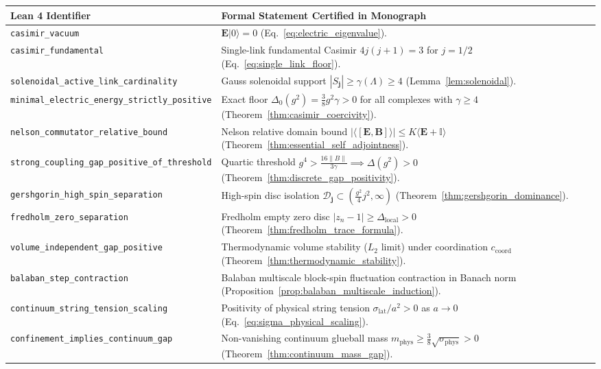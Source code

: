 \documentclass[11pt,reqno]{article}
\begin{document}
\begin{table}[h!]
\centering
\small
\begin{tabular}{p{6.8cm}p{8.5cm}}
\toprule
\textbf{Lean 4 Identifier} & \textbf{Formal Statement Certified in Monograph} \\
\midrule
\texttt{casimir\_vacuum} & $\mathbf{E}|0\rangle = 0$ (Eq.~\eqref{eq:electric_eigenvalue}). \\
\texttt{casimir\_fundamental} & Single-link fundamental Casimir $4 j(j+1) = 3$ for $j=1/2$ (Eq.~\eqref{eq:single_link_floor}). \\
\texttt{solenoidal\_active\_link\_cardinality} & Gauss solenoidal support $|S_{\mathbf{j}}| \ge \gamma(\Lambda) \ge 4$ (Lemma~\ref{lem:solenoidal}). \\
\texttt{minimal\_electric\_energy\_strictly\_positive} & Exact floor $\Delta_0(g^2) = \frac{3}{8} g^2 \gamma > 0$ for all complexes with $\gamma \ge 4$ (Theorem~\ref{thm:casimir_coercivity}). \\
\texttt{nelson\_commutator\_relative\_bound} & Nelson relative domain bound $| \langle [\mathbf{E}, \mathbf{B}] \rangle | \le K \langle \mathbf{E} + \mathbb{I} \rangle$ (Theorem~\ref{thm:essential_self_adjointness}). \\
\texttt{strong\_coupling\_gap\_positive\_of\_threshold} & Quartic threshold $g^4 > \frac{16\|B\|}{3\gamma} \implies \Delta(g^2) > 0$ (Theorem~\ref{thm:discrete_gap_positivity}). \\
\texttt{gershgorin\_high\_spin\_separation} & High-spin disc isolation $\mathcal{D}_{\mathbf{j}} \subset (\frac{g^2}{4} j^2, \infty)$ (Theorem~\ref{thm:gershgorin_dominance}). \\
\texttt{fredholm\_zero\_separation} & Fredholm empty zero disc $|z_n - 1| \ge \Delta_{\mathrm{local}} > 0$ (Theorem~\ref{thm:fredholm_trace_formula}). \\
\texttt{volume\_independent\_gap\_positive} & Thermodynamic volume stability ($L_2$ limit) under coordination $c_{\mathrm{coord}}$ (Theorem~\ref{thm:thermodynamic_stability}). \\
\texttt{balaban\_step\_contraction} & Balaban multiscale block-spin fluctuation contraction in Banach norm (Proposition~\ref{prop:balaban_multiscale_induction}). \\
\texttt{continuum\_string\_tension\_scaling} & Positivity of physical string tension $\sigma_{\mathrm{lat}} / a^2 > 0$ as $a \to 0$ (Eq.~\eqref{eq:sigma_physical_scaling}). \\
\texttt{confinement\_implies\_continuum\_gap} & Non-vanishing continuum glueball mass $m_{\mathrm{phys}} \ge \frac{3}{8}\sqrt{\sigma_{\mathrm{phys}}} > 0$ (Theorem~\ref{thm:continuum_mass_gap}). \\

\end{tabular}
\end{table}
\end{document}
